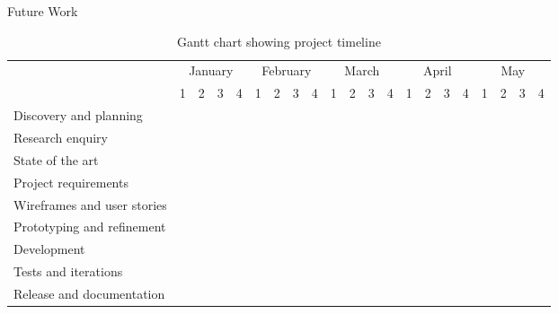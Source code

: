 \documentclass[xcolor={svgnames},aspectratio=169]{beamer}
\begin{document}
\begin{frame}{Future Work}
    \begin{table}[ht]
        \centering
        \begin{adjustbox}{width=0.9\textwidth}
        \small
        \noindent\begin{tabular}{p{}*{20}{p{}}|}
        \hline
        \multicolumn{0}{|c|}{}
            & \multicolumn{4}{c|}{January}
            & \multicolumn{4}{c|}{February}
            & \multicolumn{4}{c|}{March}
            & \multicolumn{4}{c|}{April}
            & \multicolumn{4}{c|}{May}
            \\
        \multicolumn{0}{|l|}{}
            & 1 & 2 & 3 & \multicolumn{0}{c|}{4} & 1 & 2 & 3 & \multicolumn{0}{c|}{4}& 1 & 2 & 3 & \multicolumn{0}{c|}{4}& 1 & 2 & 3 & \multicolumn{0}{c|}{4}& 1 & 2 & 3 & 4 \\
        \hline
        \multicolumn{0}{|l|}{Discovery and planning}
            & \cellcolor[cmyk]{1,1,0,0}&&&& &&&& &&&& &&&&&&& \\
        \multicolumn{0}{|l|}{Research enquiry}
            & \multicolumn{12}{c}{\cellcolor[cmyk]{1,1,0,0}} &&&& &&&& \\
        \multicolumn{0}{|l|}{State of the art}
            & \multicolumn{8}{c}{\cellcolor[cmyk]{1,1,0,0}} &&&& &&&& &&&& \\
        \multicolumn{0}{|l|}{Project requirements}
            & \multicolumn{4}{c}{\cellcolor[cmyk]{1,1,0,0}} &&&& &&&& &&&& &&&& \\
        \multicolumn{0}{|l|}{Wireframes and user stories}
            &&&& & \multicolumn{4}{c}{\cellcolor[cmyk]{1,1,0,0}} &&&& &&&& &&&& \\
        \multicolumn{0}{|l|}{Prototyping and refinement}
            &&&&&& && \multicolumn{4}{c}{\cellcolor[cmyk]{1,1,0,0}} &&&& &&&& &  \\
        \multicolumn{0}{|l|}{Development}
            &&&& &&&& & \multicolumn{12}{c}{\cellcolor[cmyk]{1,1,0,0}} \\
        \multicolumn{0}{|l|}{Tests and iterations}
            &&&& &&&& &&& & \multicolumn{5}{c}{\cellcolor[cmyk]{1,1,0,0}} &&&&  \\
        \multicolumn{0}{|l|}{Release and documentation}
            &&&& &&&& &&&& &&&& & \multicolumn{4}{c}{\cellcolor[cmyk]{1,1,0,0}} \\
        \hline
        \end{tabular}
        \end{adjustbox}
        \vspace{1em}
        \caption{Gantt chart showing project timeline}
        \label{workchart}
        \end{table}
\end{frame}
\end{document}
